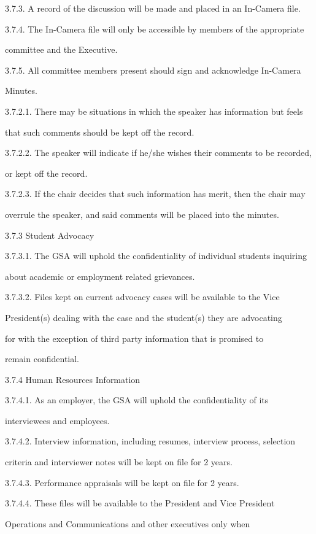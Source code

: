  3.7.3. A record of the discussion will be made and placed in an In-Camera file. 
 
 3.7.4. The In-Camera file will only be accessible by members of the appropriate 
 
 committee and the Executive. 
 
 3.7.5. All committee members present should sign and acknowledge In-Camera 
 
 Minutes. 

 3.7.2.1. There may be situations in which the speaker has information but feels 
 
 that such comments should be kept off the record. 
 
 3.7.2.2. The speaker will indicate if he/she wishes their comments to be recorded, 
 
 or kept off the record. 
 
 3.7.2.3. If the chair decides that such information has merit, then the chair may 
 
 overrule the speaker, and said comments will be placed into the minutes. 
 
 
 3.7.3 Student Advocacy 
 
 3.7.3.1. The GSA will uphold the confidentiality of individual students inquiring 
 
 about academic or employment related grievances. 
 
 3.7.3.2. Files kept on current advocacy cases will be available to the Vice 
 
 President(s) dealing with the case and the student(s) they are advocating 
 
 for with the exception of third party information that is promised to 
 
 remain confidential. 
 
 3.7.4 Human Resources Information 
 
 3.7.4.1. As an employer, the GSA will uphold the confidentiality of its 
 
 interviewees and employees. 
 
 3.7.4.2. Interview information, including resumes, interview process, selection 
 
 criteria and interviewer notes will be kept on file for 2 years. 
 
 3.7.4.3. Performance appraisals will be kept on file for 2 years. 
 
 3.7.4.4. These files will be available to the President and Vice President 
 
 Operations and Communications and other executives only when 
 
